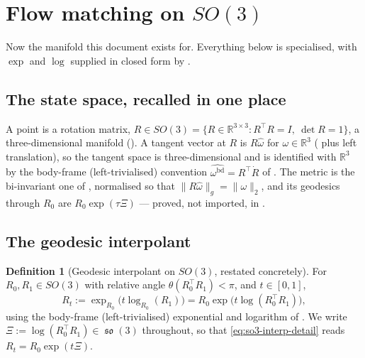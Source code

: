 \documentclass[11pt,a4paper]{report}
\theoremstyle{definition}
\newtheorem{definition}[definition]{Definition}
\theoremstyle{remark}
\DeclareMathOperator{\so}{\mathfrak{so}}
\newcommand{\RR}{\mathbb R}
\begin{document}
\section{Flow matching on $SO(3)$}
\label{sec:fm-so3-scratch}
\label{sec:rfm-so3}

Now the manifold this document exists for. Everything below is
 specialised, with $\exp$ and $\log$ supplied
in closed form by .

\subsection{The state space, recalled in one place}

A point is a rotation matrix, $R\in SO(3)=\{R\in\RR^{3\times3}:R^\top R=I,\ \det R=1\}$,
a three-dimensional manifold (). A tangent vector at $R$
is $R\widehat\omega$ for $\omega\in\RR^3$ ( plus
left translation), so the tangent space is three-dimensional and is
identified with $\RR^3$ by the body-frame (left-trivialised) convention
$\widehat{\omega^{\mathrm{bd}}}=R^\top\dot R$ of
. The metric is the bi-invariant one of
, normalised so that
$\|R\widehat\omega\|_g=\|\omega\|_2$, and its geodesics through $R_0$ are
$R_0\exp(\tau\Xi)$ --- proved, not imported, in
.

\subsection{The geodesic interpolant}

\begin{definition}[Geodesic interpolant on $SO(3)$, restated concretely]
\label{def:so3-interp-detail}
For $R_0,R_1\in SO(3)$ with relative angle $\theta(R_0^\top R_1)<\pi$, and
$t\in[0,1]$,
\begin{equation}
\label{eq:so3-interp-detail}
R_t := \exp_{R_0}\bigl(t\log_{R_0}(R_1)\bigr) = R_0\exp\bigl(t\log(R_0^\top R_1)\bigr) ,
\end{equation}
using the body-frame (left-trivialised) exponential and logarithm of
. We write $\Xi:=\log(R_0^\top R_1)\in\so(3)$
throughout, so that \eqref{eq:so3-interp-detail} reads $R_t=R_0\exp(t\Xi)$.
\end{definition}
\end{document}
